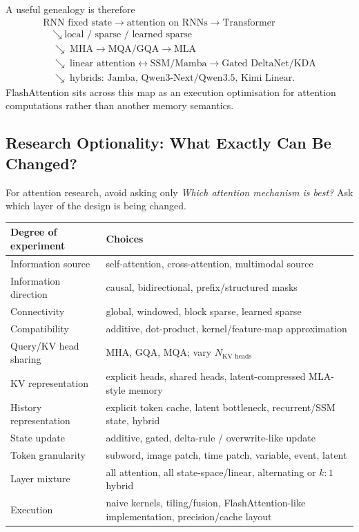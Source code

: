 A useful genealogy is therefore
\[
\begin{array}{c}
\text{RNN fixed state}
\rightarrow
\text{attention on RNNs}
\rightarrow
\text{Transformer}\\[1mm]
\quad\searrow\ \text{local / sparse / learned sparse}\\
\quad\searrow\ \text{MHA}\rightarrow\text{MQA/GQA}\rightarrow\text{MLA}\\
\quad\searrow\ \text{linear attention}\leftrightarrow\text{SSM/Mamba}\rightarrow\text{Gated DeltaNet/KDA}\\
\quad\searrow\ \text{hybrids: Jamba, Qwen3-Next/Qwen3.5, Kimi Linear}.
\end{array}
\]
FlashAttention sits across this map as an execution optimisation for attention computations rather than another memory semantics.

\subsection{Research Optionality: What Exactly Can Be Changed?}
For attention research, avoid asking only \textit{Which attention mechanism is best?}
Ask which layer of the design is being changed.

\begin{center}
\small
\begin{tabularx}{.96\linewidth}{@{}L{.28\linewidth}Y@{}}
\toprule
\textbf{Degree of experiment} & \textbf{Choices} \\
\midrule
Information source & self-attention, cross-attention, multimodal source \\
Information direction & causal, bidirectional, prefix/structured masks \\
Connectivity & global, windowed, block sparse, learned sparse \\
Compatibility & additive, dot-product, kernel/feature-map approximation \\
Query/KV head sharing & MHA, GQA, MQA; vary $N_{\text{KV heads}}$ \\
KV representation & explicit heads, shared heads, latent-compressed MLA-style memory \\
History representation & explicit token cache, latent bottleneck, recurrent/SSM state, hybrid \\
State update & additive, gated, delta-rule / overwrite-like update \\
Token granularity & subword, image patch, time patch, variable, event, latent \\
Layer mixture & all attention, all state-space/linear, alternating or $k{:}1$ hybrid \\
Execution & naive kernels, tiling/fusion, FlashAttention-like implementation, precision/cache layout \\
\bottomrule
\end{tabularx}
\end{center}

